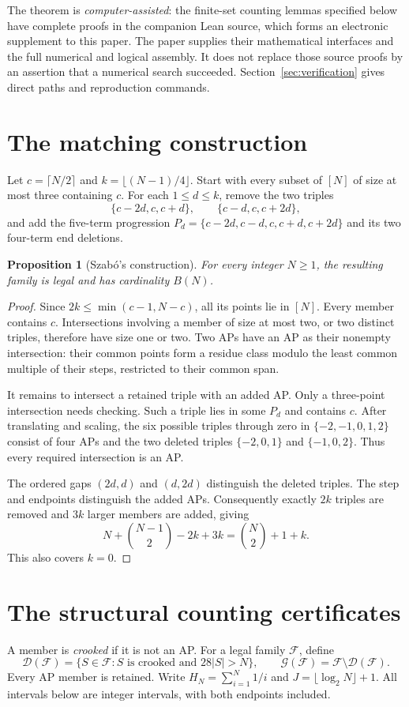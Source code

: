 \documentclass[11pt,a4paper]{article}
\newtheorem{proposition}[theorem]{Proposition}
\theoremstyle{definition}\newtheorem{definition}[theorem]{Definition}
\newcommand{\F}{\mathcal F}
\newcommand{\G}{\mathcal G}
\newcommand{\D}{\mathcal D}
\begin{document}
The theorem is \emph{computer-assisted}: the finite-set counting lemmas
specified below have complete proofs in the companion Lean source, which
forms an electronic supplement to this paper. The paper supplies their
mathematical interfaces and the full numerical and logical assembly.
It does not replace those source proofs by an assertion that a numerical
search succeeded. Section~\ref{sec:verification} gives direct paths and
reproduction commands.

\section{The matching construction}
Let $c=\lceil N/2\rceil$ and $k=\lfloor(N-1)/4\rfloor$. Start with every
subset of $[N]$ of size at most three containing $c$. For each $1\le d\le k$,
remove the two triples
\[
 \{c-2d,c,c+d\},\qquad \{c-d,c,c+2d\},
\]
and add the five-term progression
$P_d=\{c-2d,c-d,c,c+d,c+2d\}$ and its two four-term end deletions.

\begin{proposition}[Szab\'o's construction]\label{prop:lower}
For every integer $N\ge1$, the resulting family is legal and has cardinality $B(N)$.
\end{proposition}
\begin{proof}
Since $2k\le\min(c-1,N-c)$, all its points lie in $[N]$.
Every member contains $c$. Intersections involving a member of size at
most two, or two distinct triples, therefore have size one or two.
Two APs have an AP as their nonempty intersection: their common points
form a residue class modulo the least common multiple of their steps,
restricted to their common span.

It remains to intersect a retained triple with an added AP. Only a
three-point intersection needs checking. Such a triple lies in some
$P_d$ and contains $c$. After translating and scaling, the six possible
triples through zero in $\{-2,-1,0,1,2\}$ consist of four APs and the
two deleted triples $\{-2,0,1\}$ and $\{-1,0,2\}$.
Thus every required intersection is an AP.

The ordered gaps $(2d,d)$ and $(d,2d)$ distinguish the deleted triples.
The step and endpoints distinguish the added APs. Consequently exactly
$2k$ triples are removed and $3k$ larger members are added, giving
\[
 N+\binom{N-1}{2}-2k+3k=\binom N2+1+k.
\]
This also covers $k=0$.
\end{proof}

\section{The structural counting certificates}\label{sec:structural}
A member is \emph{crooked} if it is not an AP. For a legal family $\F$,
define
\[
 \D(\F)=\{S\in\F:S\text{ is crooked and }28|S|>N\},
 \qquad \G(\F)=\F\setminus\D(\F).
\]
Every AP member is retained. Write
$H_N=\sum_{i=1}^N1/i$ and $J=\lfloor\log_2N\rfloor+1$.
All intervals below are integer intervals, with both endpoints included.
\end{document}
